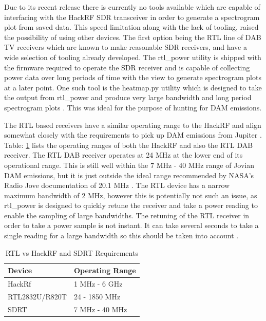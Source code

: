 Due to its recent release there is currently no tools available which are capable of interfacing with the HackRF \gls{SDR} transceiver in order to generate a spectrogram plot from saved data. This speed limitation along with the lack of tooling, raised the possibility of using other devices. The first option being the RTL line of DAB TV receivers which are known to make reasonable \gls{SDR} receivers, and have a wide selection of tooling already developed. The rtl\_power utility is shipped with the firmware required to operate the \gls{SDR} receiver and is capable of collecting power data over long periods of time with the view to generate spectrogram plots at a later point. One such tool is the heatmap.py utility which is designed to take the output from rtl\_power and produce very large bandwidth and long period spectrogram plots \citep{keen-15}. This was ideal for the purpose of hunting for \gls{DAM} emissions.

The RTL based receivers have a similar operating range to the HackRF and align somewhat closely with the requirements to pick up \gls{DAM} emissions from Jupiter \citep{hamradioscience-12}. Table: \ref{tab:rtl_vs_hackrf} lists the operating ranges of both the HackRF and also the RTL DAB receiver. The RTL DAB receiver operates at 24 MHz at the lower end of its operational range. This is still well within the 7 MHz - 40 MHz range of Jovian \gls{DAM} emissions, but it is just outside the ideal range recommended by NASA's Radio Jove documentation of 20.1 MHz \citep{nasa12}. The RTL device has a narrow maximum bandwidth of 2 MHz, however this is potentially not such an issue, as rtl\_power is designed to quickly retune the receiver and take a power reading to enable the sampling of large bandwidths. The retuning of the RTL receiver in order to take a power sample is not instant. It can take several seconds to take a single reading for a large bandwidth so this should be taken into account \citep{keen-15}.

%
\begin{table}
	\centering
	\begin{tabular}{p{4cm} l}
		\toprule
		Device & Operating Range\\ \midrule
		HackRf & 1 MHz - 6 GHz \\
		RTL2832U/R820T & 24 - 1850 MHz \\
		SDRT & 7 MHz - 40 MHz \\
		\bottomrule
	\end{tabular}
	\caption{RTL vs HackRF and SDRT Requirements}
	\label{tab:rtl_vs_hackrf}
\end{table}
%

